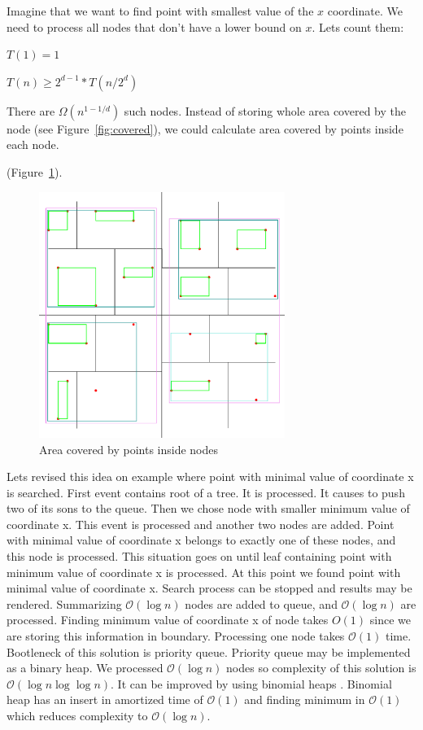\documentclass[10pt,a4paper]{article}
\newcommand{\Oh}{\mathcal{O}}
\begin{document}
Imagine that we want to find point with smallest value of the $x$ coordinate. We need to process all nodes
that don't have a lower bound on $x$. Lets count them:
\bigskip

$T(1) = 1$

$T(n) \geq 2^{d-1} * T(n/2^{d})$

\bigskip

There are $\Omega (n^{1-1/d})$ such nodes. Instead of storing whole area covered by the node (see Figure~\ref{fig:covered}), we could calculate area covered by points inside each node. 

 (Figure~\ref{fig:inside}).

\begin{figure}
\centering
  \includegraphics[width=8cm]{Figure2}
  \caption{Area covered by points inside nodes}
  \label{fig:inside}
\end{figure}

Lets revised this idea on example where point with minimal value of coordinate x is searched. First event contains root of a tree. It is processed. It causes to push two of its sons to the queue. Then we chose node with smaller minimum value of coordinate x. This event is processed and another two nodes are added. Point with minimal value of coordinate x belongs to exactly one of these nodes, and this node is processed. This situation goes on until leaf containing point with minimum value of coordinate x is processed. At this point we found point with minimal value of coordinate x. Search process can be stopped and results may be rendered. Summarizing $\Oh(\log n)$ nodes are added to queue, and $\Oh(\log n)$ are processed. Finding minimum value of coordinate x of node takes $O(1)$ since we are storing this information in boundary. Processing one node takes $\Oh(1)$ time. Bootleneck of this solution is priority queue. Priority queue may be implemented as a binary heap. We processed $\Oh(\log n)$ nodes so complexity of this solution is $\Oh(\log n \log \log n)$. It can be improved by using binomial heaps \cite{BINOMHEAPS}. Binomial heap has an insert in amortized time of $\Oh(1)$ and finding minimum in $\Oh(1)$ which reduces complexity to $\Oh(\log n)$.
\end{document}

